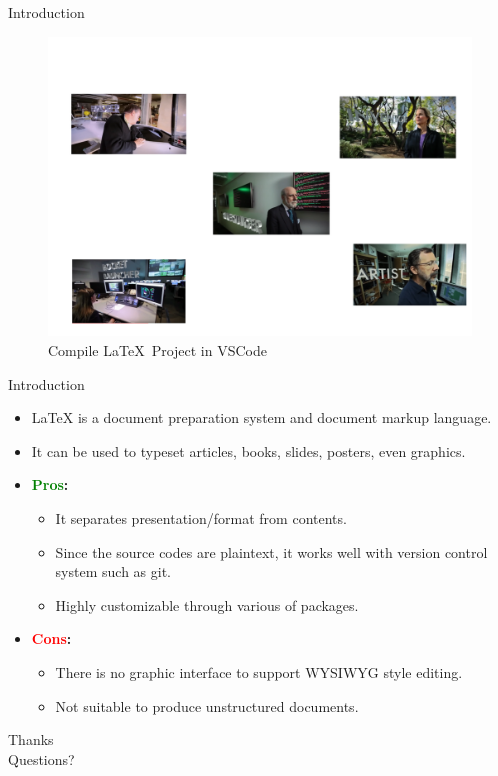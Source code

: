 \documentclass[xcolor={dvipsnames},aspectratio=169,10pt]{beamer}
\begin{document}
\begin{frame}{Introduction}
      \begin{figure}
        \centering
        \includegraphics[scale=0.2]{./figs/eng-of-the-future/versions/drawing.png}
        \caption{Compile \LaTeX~Project in VSCode}
      \end{figure}
 
\end{frame}



\begin{frame}{Introduction}
  \begin{itemize}
    \item \alert{\LaTeX{}} is a document preparation system and document markup language.
    \item It can be used to typeset articles, books, slides, posters, even graphics.
    \item \textbf{\textcolor{Green}{Pros}:}
          \begin{itemize}
            \item It separates presentation/format from contents.
            \item Since the source codes are plaintext, it works well with version control system such as git.
            \item Highly customizable through various of packages.
          \end{itemize}
    \item \textbf{\textcolor{Red}{Cons}:}
          \begin{itemize}
            \item There is no graphic interface to support WYSIWYG style editing.
            \item Not suitable to produce unstructured documents.
          \end{itemize}
  \end{itemize}
\end{frame}




\begin{frame}[standout]
  Thanks \\
  Questions?
\end{frame}
\end{document}
